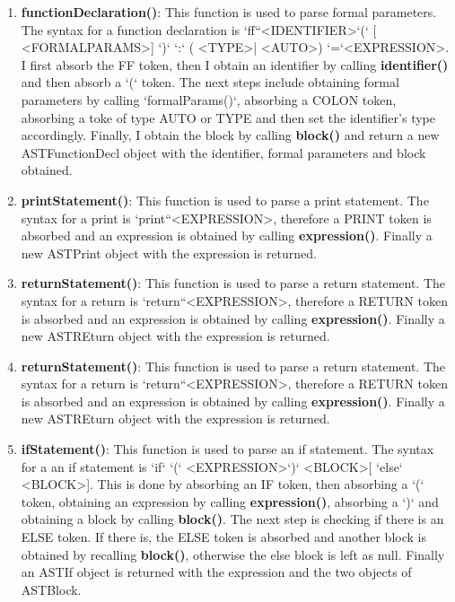 \documentclass{article}
\begin{document}
\begin{enumerate}
						\item \textbf{functionDeclaration()}: This function is used to parse formal parameters. The syntax for a function declaration is `ff``\textless IDENTIFIER\textgreater `(` [ \textless FORMALPARAMS\textgreater]  `)` `:` ( \textless TYPE\textgreater | \textless AUTO\textgreater ) `=`\textless EXPRESSION\textgreater. I first absorb the FF token, then I obtain an identifier by calling \textbf{identifier()} and then absorb a `(` token. The next steps include obtaining formal parameters by calling `formalParams()`, absorbing a COLON token, absorbing a toke of type AUTO or TYPE and then set the identifier's type accordingly. Finally, I obtain the block by calling \textbf{block()} and return a new ASTFunctionDecl object with the identifier, formal parameters and block obtained.
			
						\item \textbf{printStatement()}: This function is used to parse a print statement. The syntax for a print is `print``\textless EXPRESSION\textgreater, therefore a PRINT token is absorbed and an expression is obtained by calling \textbf{expression()}. Finally a new ASTPrint object with the expression is returned.			
				
						\item \textbf{returnStatement()}: This function is used to parse a return statement. The syntax for a return is `return``\textless EXPRESSION\textgreater, therefore a RETURN token is absorbed and an expression is obtained by calling \textbf{expression()}. Finally a new ASTREturn object with the expression is returned.					
						
						\item \textbf{returnStatement()}: This function is used to parse a return statement. The syntax for a return is `return``\textless EXPRESSION\textgreater, therefore a RETURN token is absorbed and an expression is obtained by calling \textbf{expression()}. Finally a new ASTREturn object with the expression is returned.	
						
						\item \textbf{ifStatement()}: This function is used to parse an if statement. The syntax for a an if statement is `if` `(` \textless EXPRESSION\textgreater `)` \textless BLOCK\textgreater [ `else` \textless BLOCK\textgreater ]. This is done by absorbing an IF token, then absorbing a `(` token, obtaining an expression by calling \textbf{expression()}, absorbing a `)` and obtaining a block by calling \textbf{block()}. The next step is checking if there is an ELSE token. If there is, the ELSE token is absorbed and another block is obtained by recalling \textbf{block()}, otherwise the else block is left as null. Finally an ASTIf object is returned with the expression and the two objects of ASTBlock.
						

\end{enumerate}
\end{document}
